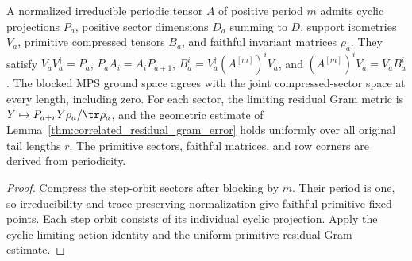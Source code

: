 \begin{lemma}
    \label{thm:periodic_correlated_residual_gram}
    \leanok
    A normalized irreducible periodic tensor $A$ of positive period $m$
    admits cyclic projections $P_a$, positive sector dimensions $D_a$ summing
    to $D$, support isometries $V_a$, primitive compressed tensors $B_a$,
    and faithful invariant matrices $\rho_a$. They satisfy
    $V_aV_a^\dagger=P_a$, $P_aA_i=A_iP_{a+1}$,
    $B_a^i=V_a^\dagger(A^{[m]})^iV_a$, and
    $(A^{[m]})^iV_a=V_aB_a^i$. The blocked MPS ground space agrees with
    the joint compressed-sector space at every length, including zero.
    For each sector, the limiting residual Gram metric is
    $Y\mapsto P_{a+r}Y\rho_a/\tr\rho_a$, and the geometric estimate of
    Lemma~\ref{thm:correlated_residual_gram_error} holds uniformly over
    all original tail lengths $r$. The primitive sectors, faithful matrices,
    and row corners are derived from periodicity.
\end{lemma}
\begin{proof}\leanok
    Compress the step-orbit sectors after blocking by $m$. Their period is
    one, so irreducibility and trace-preserving normalization give faithful
    primitive fixed points. Each step orbit consists of its individual cyclic
    projection. Apply the cyclic limiting-action identity and the uniform
    primitive residual Gram estimate.
\end{proof}

